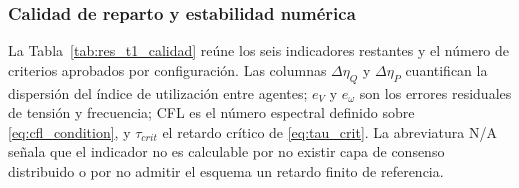 \subsubsection{Calidad de reparto y estabilidad numérica}

La Tabla~\ref{tab:res_t1_calidad} reúne los seis indicadores restantes y el número de criterios aprobados por configuración. Las columnas $\Delta \eta_Q$ y $\Delta \eta_P$ cuantifican la dispersión del índice de utilización entre agentes; $e_V$ y $e_\omega$ son los errores residuales de tensión y frecuencia; CFL es el número espectral definido sobre \eqref{eq:cfl_condition}, y $\tau_{crit}$ el retardo crítico de \eqref{eq:tau_crit}. La abreviatura N/A señala que el indicador no es calculable por no existir capa de consenso distribuido o por no admitir el esquema un retardo finito de referencia.

